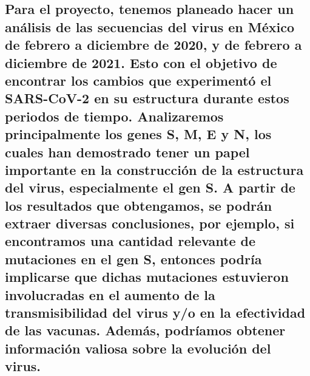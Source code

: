 \documentclass[
]{article}
\begin{document}
\hypertarget{para-el-proyecto-tenemos-planeado-hacer-un-anuxe1lisis-de-las-secuencias-del-virus-en-muxe9xico-de-febrero-a-diciembre-de-2020-y-de-febrero-a-diciembre-de-2021.-esto-con-el-objetivo-de-encontrar-los-cambios-que-experimentuxf3-el-sars-cov-2-en-su-estructura-durante-estos-periodos-de-tiempo.-analizaremos-principalmente-los-genes-s-m-e-y-n-los-cuales-han-demostrado-tener-un-papel-importante-en-la-construcciuxf3n-de-la-estructura-del-virus-especialmente-el-gen-s.-a-partir-de-los-resultados-que-obtengamos-se-podruxe1n-extraer-diversas-conclusiones-por-ejemplo-si-encontramos-una-cantidad-relevante-de-mutaciones-en-el-gen-s-entonces-podruxeda-implicarse-que-dichas-mutaciones-estuvieron-involucradas-en-el-aumento-de-la-transmisibilidad-del-virus-yo-en-la-efectividad-de-las-vacunas.-ademuxe1s-podruxedamos-obtener-informaciuxf3n-valiosa-sobre-la-evoluciuxf3n-del-virus.}{%
\subsection{Para el proyecto, tenemos planeado hacer un análisis de las
secuencias del virus en México de febrero a diciembre de 2020, y de
febrero a diciembre de 2021. Esto con el objetivo de encontrar los
cambios que experimentó el SARS-CoV-2 en su estructura durante estos
periodos de tiempo. Analizaremos principalmente los genes S, M, E y N,
los cuales han demostrado tener un papel importante en la construcción
de la estructura del virus, especialmente el gen S. A partir de los
resultados que obtengamos, se podrán extraer diversas conclusiones, por
ejemplo, si encontramos una cantidad relevante de mutaciones en el gen
S, entonces podría implicarse que dichas mutaciones estuvieron
involucradas en el aumento de la transmisibilidad del virus y/o en la
efectividad de las vacunas. Además, podríamos obtener información
valiosa sobre la evolución del
virus.}\label{para-el-proyecto-tenemos-planeado-hacer-un-anuxe1lisis-de-las-secuencias-del-virus-en-muxe9xico-de-febrero-a-diciembre-de-2020-y-de-febrero-a-diciembre-de-2021.-esto-con-el-objetivo-de-encontrar-los-cambios-que-experimentuxf3-el-sars-cov-2-en-su-estructura-durante-estos-periodos-de-tiempo.-analizaremos-principalmente-los-genes-s-m-e-y-n-los-cuales-han-demostrado-tener-un-papel-importante-en-la-construcciuxf3n-de-la-estructura-del-virus-especialmente-el-gen-s.-a-partir-de-los-resultados-que-obtengamos-se-podruxe1n-extraer-diversas-conclusiones-por-ejemplo-si-encontramos-una-cantidad-relevante-de-mutaciones-en-el-gen-s-entonces-podruxeda-implicarse-que-dichas-mutaciones-estuvieron-involucradas-en-el-aumento-de-la-transmisibilidad-del-virus-yo-en-la-efectividad-de-las-vacunas.-ademuxe1s-podruxedamos-obtener-informaciuxf3n-valiosa-sobre-la-evoluciuxf3n-del-virus.}}
\end{document}
